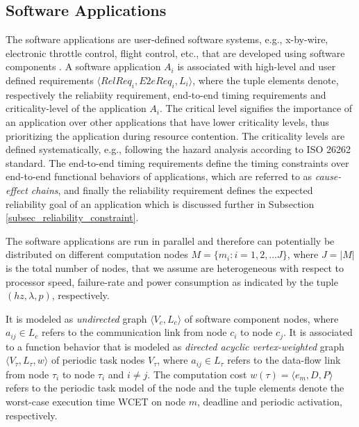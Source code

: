 \subsection{Software Applications}
The software applications are user-defined software systems, e.g., x-by-wire, electronic throttle control, flight control, etc., that are developed using software components \cite{softwarecomponents}\cite{Crnkovic2002BuildingSystems}. A software application $A_i$ is associated with high-level and user defined requirements $\langle RelReq_i, E2eReq_i,L_i\rangle$, where the tuple elements denote, respectively the reliabiity requirement, end-to-end timing requirements and criticality-level of the application $A_i$. The critical level signifies the importance of an application over other applications that have lower criticality levels, thus prioritizing the application during resource contention. The criticality levels are defined systematically, e.g., following the hazard analysis according to ISO 26262 standard. The end-to-end timing requirements define the timing constraints over end-to-end functional behaviors of applications, which are referred to as \textit{cause-effect chains}, and finally the reliability requirement defines the expected reliability goal of an application which is discussed further in Subsection \ref{subsec_reliability_constraint}. 

The software applications are run in parallel and therefore can potentially be distributed on different computation nodes $M =\{m_i:i=1,2,\dots J\}$, where $J=|M|$ is the total number of nodes, that we assume are heterogeneous with respect to processor speed, failure-rate and power consumption as indicated by the tuple $(hz, \lambda, p)$, respectively. 

\begin{definition}
It is modeled as \textit{undirected} graph $\langle V_c,L_c\rangle$ of software component nodes, where $a_{ij}\in L_c$ refers to the communication link from node $c_i$ to node $c_j$. It is associated to a function behavior that is modeled as \textit{directed acyclic vertex-weighted} graph $\langle V_\tau,L_\tau, w\rangle$ of periodic task nodes $V_\tau$, where $a_{ij}\in L_\tau$ refers to the data-flow link from node $\tau_i$ to node $\tau_i$ and $i \neq j$. The computation cost $w(\tau)=\langle e_m,D,P\rangle$ refers to the periodic task model of the node and the tuple elements denote the worst-case execution time {WCET} on node $m$, deadline and periodic activation, respectively.
\end{definition}

